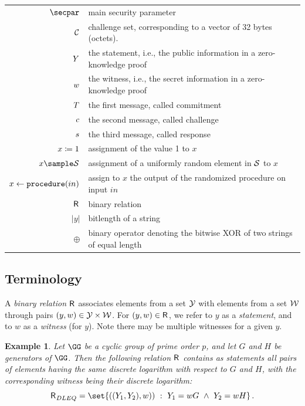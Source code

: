 \documentclass[11pt]{article}
\newtheorem{example}{Example}
\begin{document}
\begin{tabular}{r@{\hspace{1em}}p{13cm}}
    $\secpar$ & main security parameter\\
    $\mathcal{C}$ & challenge set, corresponding to a vector of 32 bytes (octets).\\
    $Y$ & the statement, i.e., the public information in a zero-knowledge proof \\
    $w$ & the witness, i.e., the secret information in a zero-knowledge proof \\
    $T$ & the first message, called commitment \\
    $c$ & the second message, called challenge \\
    $s$ & the third message, called response \\
    $x \coloneqq 1$ & assignment of the value 1 to $x$\\
    $x\sample\someset$ & assignment of a uniformly random element in $\mathcal{S}$ to $x$\\
    $x\gets\texttt{procedure}(in)$ & assign to $x$ the output of the randomized procedure on input $in$\\
    ${\mathsf{R}_{\operatorname{{}}}}$ & binary relation\\
    $|y|$ & bitlength of a string \\
    $\oplus$ & binary operator denoting the bitwise XOR of two strings of equal length
\end{tabular}

\subsection{Terminology}
A \emph{binary relation} ${\mathsf{R}_{\operatorname{{}}}}$ associates elements from a set $\mathcal{Y}$ with elements from a set $\mathcal{W}$ through pairs $(y,w)\in\mathcal{Y}\times\mathcal{W}$.
For $(y,w)\in{\mathsf{R}_{\operatorname{{}}}}$, we refer to $y$ as a \emph{statement}, and to $w$ as a \emph{witness} (for $y$).
Note there may be multiple witnesses for a given $y$.

\begin{example}
  Let $\GG$ be a cyclic group of prime order $p$, and let $G$ and $H$ be generators of $\GG$.
	Then the following relation ${\mathsf{R}_{\operatorname{{}}}}$ contains as statements all pairs of elements having the same discrete logarithm with respect to $G$ and $H$, with the corresponding witness being their discrete logarithm:
  $$
	  \relation_{DLEQ} = \set{\left((Y_1,Y_2),w)\right)~:~Y_1=wG ~\land~ Y_2=wH}\,.
	$$
\end{example}
\end{document}
